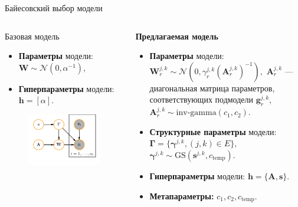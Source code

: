 \documentclass[usenames,dvipsnames,11pt,pdf,utf8,russian,aspectratio=43]{beamer}
\begin{document}
\begin{frame}{Байесовский выбор модели}


\begin{columns}
\begin{column}{0.4\textwidth}
Базовая модель %
\begin{itemize}
\item \textbf{Параметры} модели:\\ $\mathbf{W} \sim \mathcal{N}(0, \alpha^{-1}),$
\item \textbf{Гиперпараметры} модели: $\mathbf{h} = [\alpha].$
\end{itemize}
\begin{figure}
\includegraphics[width=\textwidth]{simple_plate_concrete.pdf}
\end{figure}
\end{column}
\begin{column}{0.6\textwidth}
\textbf{Предлагаемая модель  }
\begin{itemize}
\item \textbf{Параметры} модели:\\ $\mathbf{W}_r^{j,k} \sim \mathcal{N}(0, \gamma_{r}^{j,k} (\mathbf{A}_r^{j,k})^{-1}),$
$\mathbf{A}_r^{j,k}$ --- диагональная матрица параметров, соответствующих подмодели $\mathbf{g}_r^{j,k}$,
\\$\mathbf{A}_r^{j,k} \sim \text{inv-gamma}(c_1,c_2)$.

\item \textbf{Структурные параметры} модели:\\$\boldsymbol{\Gamma} = \{\boldsymbol{\gamma}^{j,k}, (j,k) \in E\},$ \\$\boldsymbol{\gamma}^{j,k} \sim \text{GS}(\mathbf{s}^{j,k}, c_\text{temp}).$ 
\item \textbf{Гиперпараметры} модели: $\mathbf{h} = \{\mathbf{A}, \mathbf{s} \}.$
\item \textbf{Метапараметры:} $c_1,c_2,c_\text{temp}$.
\end{itemize}


\end{column}
\end{columns}
\end{frame}
\end{document}
